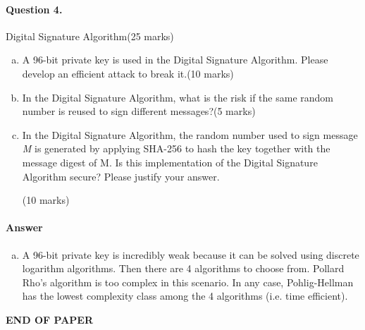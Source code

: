 \documentclass[12pt]{article}
\begin{document}
\newpage
\paragraph{Question 4.}   Digital Signature Algorithm\hfill (25 marks)
\begin{enumerate}[(a)]
    \item A 96-bit private key is used in the Digital Signature Algorithm. Please develop an efficient attack to break it.\hfill (10 marks)
    \item In the Digital Signature Algorithm, what is the risk if the same random number is reused to sign different messages?\hfill (5 marks)
    \item In the Digital Signature Algorithm, the random number used to sign message \textit{M} is generated by applying SHA-256 to hash the key together with the message digest of M. Is this implementation of the Digital Signature Algorithm secure? Please justify your answer.{\vspace{-2.5em}\begin{flushright} (10 marks)\end{flushright}}
\end{enumerate}
\paragraph{Answer}
\begin{enumerate}[(a)]
\item A 96-bit private key is incredibly weak because it can be solved using discrete logarithm algorithms. Then there are 4 algorithms to choose from. Pollard Rho's algorithm is too complex in this scenario. In any case, Pohlig-Hellman has the lowest complexity class among the 4 algorithms (i.e. time efficient).
\end{enumerate}
\bigskip
\vfill
\begin{center}{\bf END OF PAPER}\end{center}
\end{document}
